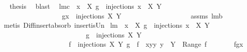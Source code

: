\begin{isabellebody}
\ \isamarkupfalse%
\ {\isacharquery}thesis\ \isamarkupfalse%
\ blast\ \isanewline
{}\isamarkupfalse%
%
\endisatagproof
{\isafoldproof}%
%
\isadelimproof
\isanewline
%
\endisadelimproof
\isanewline
{}\isamarkupfalse%
\ lm{}{}c{\isacharcolon}\ \ {\isachardoublequoteopen}x\ {\isasymnotin}\ X{\isachardoublequoteclose}\ {\isachardoublequoteopen}g\ {\isasymin}\ injections\ {\isacharparenleft}{\isacharbraceleft}x{\isacharbraceright}\ {\isasymunion}\ X{\isacharparenright}\ Y{\isachardoublequoteclose}\ \isanewline
\ \ \ \ \ \ \ \ \ \ \ \ \ \ \ \ \ \ {\isachardoublequoteopen}g{\isacharminus}{\isacharminus}x\ {\isasymin}\ injections\ X\ Y{\isachardoublequoteclose}\ \isanewline
%
\isadelimproof
\ \ \ \ \ \ \ \ \ \ \ \ \ \ \ \ \ %
\endisadelimproof
%
\isatagproof
{}\isamarkupfalse%
\ assms\ lm{}{}b\ \isamarkupfalse%
\ {\isacharparenleft}metis\ Diff{\isacharunderscore}insert{\isacharunderscore}absorb\ insert{\isacharunderscore}is{\isacharunderscore}Un{\isacharparenright}%
\endisatagproof
{\isafoldproof}%
%
\isadelimproof
\isanewline
%
\endisadelimproof
\isanewline
{}\isamarkupfalse%
\ lm{}{}{\isacharcolon}\ \ {\isachardoublequoteopen}x\ {\isasymnotin}\ X{\isachardoublequoteclose}\ {\isachardoublequoteopen}g\ {\isasymin}\ injections\ {\isacharparenleft}{\isacharbraceleft}x{\isacharbraceright}\ {\isasymunion}\ X{\isacharparenright}\ Y{\isachardoublequoteclose}\ \isanewline
\ \ \ \ \ \ \ \ \ \ \ \ \ \ \ \ \ \ \ \ \ \ \ \ {\isacharparenleft}\ {\isachardoublequoteopen}g\ {\isasymin}\ injections\ {\isacharparenleft}{\isacharquery}X{\isacharparenright}\ Y{\isachardoublequoteclose}{\isacharparenright}\ \isanewline
\ \ \ \ \ \ \ \ \ \ \ \ \ \ \ \ \ \ \ {\isachardoublequoteopen}{\isasymexists}\ f\ {\isasymin}\ injections\ X\ Y{\isachardot}\ g\ {\isasymin}\ {\isacharbraceleft}f\ {\isasymunion}\ {\isacharbraceleft}{\isacharparenleft}x{\isacharcomma}y{\isacharparenright}{\isacharbraceright}{\isacharbar}y{\isachardot}\ y\ {\isasymin}\ Y\ {\isacharminus}\ {\isacharparenleft}Range\ f{\isacharparenright}{\isacharbraceright}{\isachardoublequoteclose}\ \isanewline
%
\isadelimproof
%
\endisadelimproof
%
\isatagproof
{}\isamarkupfalse%
\ {\isacharminus}\ \isanewline
\ \ \isamarkupfalse%
\ {\isacharquery}f{\isacharequal}{\isachardoublequoteopen}g{\isacharminus}{\isacharminus}x{\isachardoublequoteclose}\ \isamarkupfalse%

\end{isabellebody}
